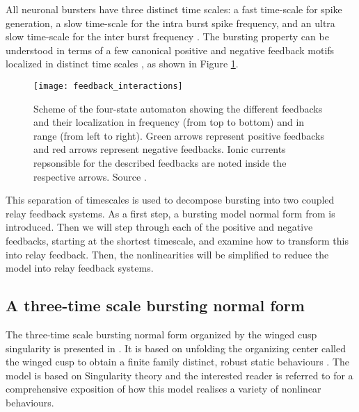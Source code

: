\documentclass[a4paper, 12pt]{article}
\begin{document}
All neuronal bursters have three distinct time scales: a fast time-scale for spike generation, a slow time-scale for the intra burst spike frequency, and an ultra slow time-scale for the inter burst frequency \cite{franci2}. The bursting property can be understood in terms of a few canonical positive and negative feedback motifs localized in distinct time scales \cite{drion}, as shown in Figure \ref{fig:p_n_feedbacks}.

\begin{figure}[h!]
\texttt{[image: feedback\_interactions]}
\caption{Scheme of the four-state automaton showing the different feedbacks and their localization in frequency (from top to bottom) and in range (from left to right). Green arrows represent positive feedbacks and red arrows represent negative feedbacks. Ionic currents repsonsible for the described feedbacks are noted inside the respective arrows. Source \cite{drion}.}
\label{fig:p_n_feedbacks}
\end{figure}

This separation of timescales is used to decompose bursting into two coupled relay feedback systems. As a first step, a bursting model normal form from \cite{franci} is introduced. Then we will step through each of the positive and negative feedbacks, starting at the shortest timescale, and examine how to transform this into relay feedback. Then, the nonlinearities will be simplified to reduce the model into relay feedback systems. 

\subsection{A three-time scale bursting normal form}
The three-time scale bursting normal form organized by the winged cusp singularity is presented in \cite{franci}. It is based on unfolding the organizing center called the winged cusp to obtain a finite family distinct, robust static behaviours \cite{franci}. The model is based on Singularity theory and the interested reader is referred to \cite{franci} for a comprehensive exposition of how this model realises a variety of nonlinear behaviours. 
\end{document}
